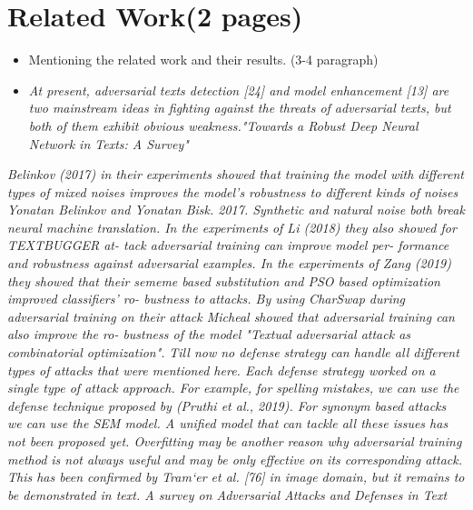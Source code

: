 \documentclass[%
	BCOR=8mm, %
	DIV=12, 
	toc=bibliography, %
	toc=listof, %
	oneside, %
	egregdoesnotlikesansseriftitles, %
	]{scrbook}
\begin{document}







\chapter{Related Work(2 pages)} 

\begin{itemize}
\item Mentioning the related work and their results. (3-4 paragraph) 
\item \textit{At present, adversarial texts detection [24] and model enhancement [13] are two mainstream ideas in fighting against the threats of adversarial texts, but
 both of them exhibit obvious weakness."Towards a Robust Deep Neural Network in Texts: A Survey"}
\end{itemize}

\textit{Belinkov (2017) in their experiments showed that training the model with different types of mixed noises improves the model’s robustness to different kinds of noises 
Yonatan Belinkov and Yonatan Bisk. 2017. Synthetic and natural noise both break neural machine translation. In the experiments of Li (2018) they also showed for TEXTBUGGER 
at- tack adversarial training can improve model per- formance and robustness against adversarial examples.  In the experiments of Zang (2019) they showed that their sememe based substitution 
and PSO based optimization improved classifiers’ ro- bustness to attacks. By using CharSwap during adversarial training on their attack Micheal showed that adversarial training can also
 improve the ro- bustness of the model "Textual adversarial attack as combinatorial optimization".}
\textit{Till now no defense strategy can handle all different types of attacks that were mentioned here. Each defense strategy worked on a single type of attack approach. For example, for spelling 
mistakes, we can use the defense technique proposed by (Pruthi et al., 2019). For synonym based attacks we can use the SEM model. A unified model that can tackle all these issues has not 
been proposed yet. \cite{huq_adversarial_2020} Overfitting may be another reason why adversarial training method is not always useful and may be only effective on its corresponding attack. 
This has been confirmed by Tram‘er et al. [76] in image domain, but it remains to be demonstrated in text. A survey on Adversarial Attacks and Defenses in Text}
\end{document}

